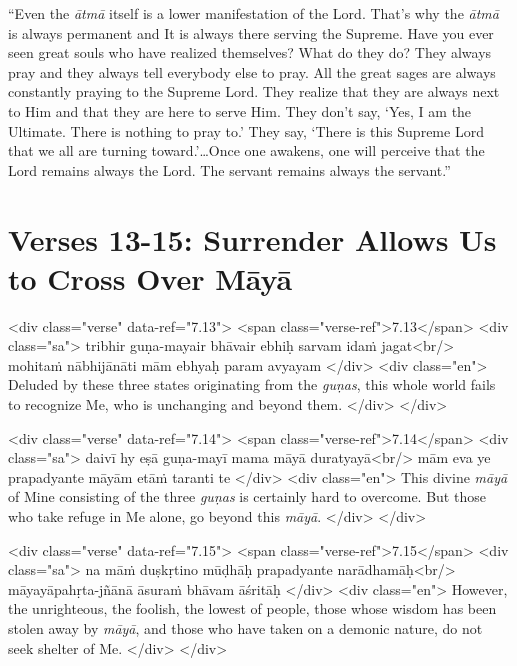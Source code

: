 \enquote{Even the \textit{ātmā} itself is a lower manifestation of the Lord. That’s why the \textit{ātmā} is always permanent and It is always there serving the Supreme. Have you ever seen great souls who have realized themselves? What do they do? They always pray and they always tell everybody else to pray. All the great sages are always constantly praying to the Supreme Lord. They realize that they are always next to Him and that they are here to serve Him. They don’t say, \enquote{Yes, I am the Ultimate. There is nothing to pray to.} They say, \enquote{There is this Supreme Lord that we all are turning toward.}\ldots Once one awakens, one will perceive that the Lord remains always the Lord. The servant remains always the servant.}

\section{Verses 13-15: Surrender Allows Us to Cross Over Māyā}\label{sec-verses-13-15-surrender-allows-us-to-cross-over-maya}


\begin{html}
<div class="verse" data-ref="7.13">
  <span class="verse-ref">7.13</span>
  <div class="sa">
    tribhir guṇa-mayair bhāvair ebhiḥ sarvam idaṁ jagat<br/>
    mohitaṁ nābhijānāti mām ebhyaḥ param avyayam
  </div>
  <div class="en">
    Deluded by these three states originating from the \textit{guṇas}, this whole world fails to recognize Me, who is unchanging and beyond them.
  </div>
</div>
\end{html}



\begin{html}
<div class="verse" data-ref="7.14">
  <span class="verse-ref">7.14</span>
  <div class="sa">
    daivī hy eṣā guṇa-mayī mama māyā duratyayā<br/>
    mām eva ye prapadyante māyām etāṁ taranti te
  </div>
  <div class="en">
    This divine \textit{māyā} of Mine consisting of the three \textit{guṇas} is certainly hard to overcome. But those who take refuge in Me alone, go beyond this \textit{māyā}.
  </div>
</div>
\end{html}



\begin{html}
<div class="verse" data-ref="7.15">
  <span class="verse-ref">7.15</span>
  <div class="sa">
    na māṁ duṣkṛtino mūḍhāḥ prapadyante narādhamāḥ<br/>
    māyayāpahṛta-jñānā āsuraṁ bhāvam āśritāḥ
  </div>
  <div class="en">
    However, the unrighteous, the foolish, the lowest of people, those whose wisdom has been stolen away by \textit{māyā}, and those who have taken on a demonic nature, do not seek shelter of Me.
  </div>
</div>
\end{html}


